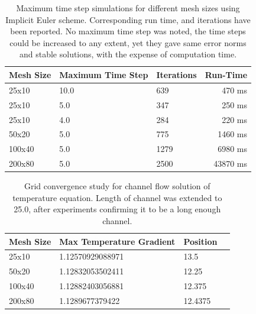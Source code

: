 \documentclass[a4paper,10pt]{article}
\begin{document}
\begin{enumerate}[I]
  \begin{table}
      \begin{center}
        \begin{tabular}{|l | l | l | r |}
          \hline
          Mesh Size & Maximum Time Step & Iterations & Run-Time \\
          \hline
          25x10 & 10.0 & 639 & 470 ms \\
          25x10 & 5.0 & 347 & 250  ms \\
          25x10 & 4.0 & 284 & 220 ms \\
          50x20 & 5.0 & 775 & 1460 ms \\
          100x40 & 5.0 & 1279 & 6980 ms \\
          200x80 & 5.0 & 2500 & 43870 ms \\
          \hline
        \end{tabular}
        \caption{Maximum time step simulations for different mesh sizes using Implicit Euler scheme. Corresponding run time, and iterations have been reported. No maximum time step was noted, the time steps could be increased to any extent, yet they gave same error norms and stable solutions, with the expense of computation time.}
        \label{effIE}      
      \end{center}
    \end{table}


  \begin{table}
      \begin{center}
        \begin{tabular}{|l | l | l | r |}
          \hline
          Mesh Size & Max Temperature Gradient & Position \\
          \hline
          25x10 & 1.12570929088971 & 13.5 \\
          50x20 & 1.12832053502411  & 12.25 \\
          100x40 & 1.12882403056881 & 12.375 \\
          200x80 & 1.1289677379422 & 12.4375 \\
          \hline
        \end{tabular}
        \caption{Grid convergence study for channel flow solution of temperature equation. Length of channel was extended to 25.0, after experiments confirming it to be a long enough channel.}
        \label{gci}      
      \end{center}
    \end{table}




\end{enumerate}
\end{document}
